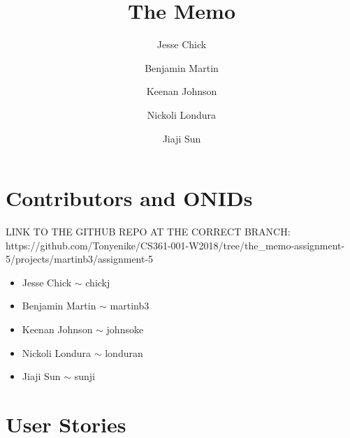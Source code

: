 \documentclass[12pt]{article}
\title{The Memo}
\author{Jesse Chick\\
\and Benjamin Martin\\
\and Keenan Johnson\\
\and Nickoli Londura\\
\and Jiaji Sun}
\begin{document}
\maketitle
\tableofcontents

\section{Contributors and ONIDs}
\par
LINK TO THE GITHUB REPO AT THE CORRECT BRANCH: https://github.com/Tonyenike/CS361-001-W2018/tree/the\_memo-assignment-5/projects/martinb3/assignment-5

\begin{itemize}
	\item Jesse Chick $\sim$ chickj
	\item Benjamin Martin $\sim$ martinb3
	\item Keenan Johnson $\sim$ johnsoke
	\item Nickoli Londura $\sim$ londuran
	\item Jiaji Sun $\sim$ sunji
\end{itemize}

\section{User Stories}
\end{document}
